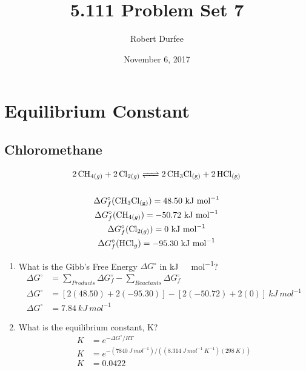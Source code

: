 \documentclass{article}
\title{5.111 Problem Set 7}
\author{Robert Durfee}
\date{November 6, 2017}
\begin{document}
\maketitle

\section{Equilibrium Constant}

\subsection{Chloromethane}
\begin{gather*}
    \ce{2CH_{4(g)} + 2Cl_{2(g)} <=> 2CH_3Cl_{(g)} + 2HCl_{(g)}}\\\\
    \Delta G^{\circ}_{f}(\ce{CH_{3}Cl_{(g)}}) = 48.50\ \si{kJ\ mol^{-1}}\\
    \Delta G^{\circ}_{f}(\ce{CH_{4(g)}}) = -50.72\ \si{kJ\ mol^{-1}}\\
    \Delta G^{\circ}_{f}(\ce{Cl_{2(g)}}) = 0\ \si{kJ\ mol^{-1}}\\
    \Delta G^{\circ}_{f}(\ce{HCl_{g}}) = -95.30\ \si{kJ\ mol^{-1}}
\end{gather*}

\begin{enumerate}
    \item What is the Gibb's Free Energy $\Delta G^{\circ}$ in \si{kJ\
        mol^{-1}}?
    \begin{align*}
        \Delta G^{\circ}&=\sum\limits_{Products}\Delta G^{\circ}_{f} -
        \sum\limits_{Reactants} \Delta G^{\circ}_{f}\\
        \Delta
        G^{\circ}&=\left[2(48.50)+2(-95.30)\right]-\left[2(-50.72)+2(0)\right]\
        \si{kJ\ mol^{-1}}\\
        \Delta G^{\circ}&=7.84\ \si{kJ\ mol^{-1}}
    \end{align*}
    \item What is the equilibrium constant, K?
    \begin{align*}
        K &= e^{-\Delta G^{\circ}/RT}\\
        K &= e^{-(7840\ \si{J\ mol^{-1}})/((8.314\ \si{J\ mol^{-1}}\
    K^{-1})(298\ \si{K}))}\\
        K &= 0.0422
    \end{align*}
    
\end{enumerate}
\end{document}
